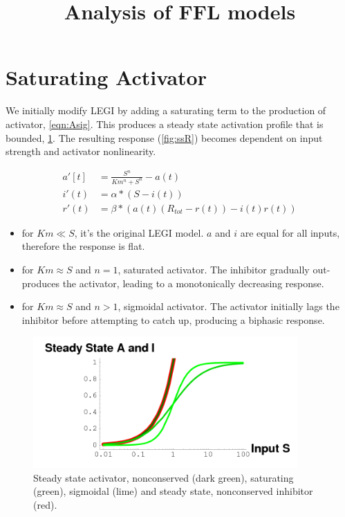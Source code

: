 \documentclass{article}
\begin{document}
\title{Analysis of FFL models}

\section{Saturating Activator}

We initially modify LEGI by adding a saturating term to the production of
activator, \cref{eqn:Asig}.
This produces a steady state activation profile that is bounded, \cref{fig:ssAI}.
The resulting response (\cref{fig:ssR}) becomes dependent on input strength
and activator nonlinearity. 

\begin{align}
    a'[t] &= \frac{ S^n }{ Km^n + S^n } - a(t) \label{eqn:Asig}\\
    i'(t) &= \alpha * ( S - i(t)) \\
    r'(t) &= \beta * ( a(t) ( R_{tot} - r(t) ) - i(t) r(t) )
\end{align}

\begin{itemize}
    \item for $Km \ll S$, it's the original LEGI model. $a$ and $i$  are equal
        for all inputs, therefore the response is flat.
    \item for $Km \approx S$ and $n=1$, saturated activator. The inhibitor
        gradually out-produces the activator, leading to a monotonically
        decreasing response. 
    \item for $Km \approx S$ and $n>1$, sigmoidal activator. The activator
        initially lags the inhibitor before attempting to catch up, producing a
        biphasic response.
\end{itemize}

\begin{figure}
    \centering
    \includegraphics[width=0.9\textwidth]{ssAIR.png}
    \caption{Steady state activator, nonconserved (dark green),
        saturating (green), sigmoidal (lime) and steady state,
        nonconserved inhibitor (red). \label{fig:ssAI}}
\end{figure}
\end{document}
